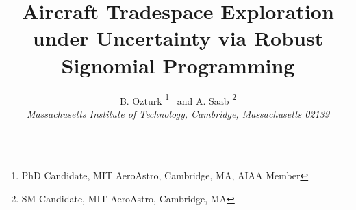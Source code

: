  \title{Aircraft Tradespace Exploration under Uncertainty via Robust Signomial Programming}

 \author{
  B. Ozturk%
    \thanks{PhD Candidate, MIT AeroAstro, Cambridge, MA, AIAA Member}
  \ and A. Saab
     \thanks{SM Candidate, MIT AeroAstro, Cambridge, MA}
\\
  {\normalsize\itshape
   Massachusetts Institute of Technology, Cambridge, Massachusetts 02139}\\
 }


 \newcommand{\eqnref}[1]{(\ref{#1})}
 \newcommand{\class}[1]{\texttt{#1}}
 \newcommand{\package}[1]{\texttt{#1}}
 \newcommand{\file}[1]{\texttt{#1}}
 \newcommand{\BibTeX}{\textsc{Bib}\TeX}

\renewcommand{\vec}{\mathbf}
\newcommand{\mat}{\mathbf}

\usepackage[utf8]{inputenc}
\usepackage{algorithm}
\usepackage{bbm}
\usepackage{amsmath}
\usepackage{amsthm}
\usepackage{amssymb}
\usepackage{multicol}
\usepackage{tabularx}
\usepackage[toc,page]{appendix}
\usepackage{verbatim}
\usepackage{tikz}
\usepackage{tkz-kiviat}
\usetikzlibrary{arrows}
\usepackage{subcaption} 
\usepackage{graphicx}

 \newtheorem{theorem}{Theorem}[section]
 \newtheorem{corollary}{Corollary}[theorem]
 \newtheorem{lemma}[theorem]{Lemma}
 \newtheorem{proposition}[theorem]{Proposition}
